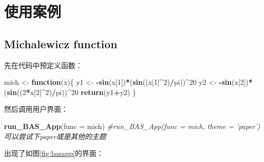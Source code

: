 \documentclass[]{ctexbook}
\newenvironment{Shaded}{\begin{snugshade}}{\end{snugshade}}
\newcommand{\KeywordTok}[1]{\textcolor[rgb]{0.13,0.29,0.53}{\textbf{#1}}}
\newcommand{\DataTypeTok}[1]{\textcolor[rgb]{0.13,0.29,0.53}{#1}}
\newcommand{\DecValTok}[1]{\textcolor[rgb]{0.00,0.00,0.81}{#1}}
\newcommand{\StringTok}[1]{\textcolor[rgb]{0.31,0.60,0.02}{#1}}
\newcommand{\CommentTok}[1]{\textcolor[rgb]{0.56,0.35,0.01}{\textit{#1}}}
\newcommand{\ControlFlowTok}[1]{\textcolor[rgb]{0.13,0.29,0.53}{\textbf{#1}}}
\newcommand{\OperatorTok}[1]{\textcolor[rgb]{0.81,0.36,0.00}{\textbf{#1}}}
\newcommand{\NormalTok}[1]{#1}
\theoremstyle{definition}
\theoremstyle{definition}
\theoremstyle{definition}
\theoremstyle{remark}
\begin{document}
\section{使用案例}

\subsection{Michalewicz function}\label{michalewicz-function-1}

先在代码中预定义函数：

\begin{Shaded}
\begin{Highlighting}[]
\NormalTok{mich <-}\StringTok{ }\ControlFlowTok{function}\NormalTok{(x)\{}
\NormalTok{  y1 <-}\StringTok{ }\OperatorTok{-}\KeywordTok{sin}\NormalTok{(x[}\DecValTok{1}\NormalTok{])}\OperatorTok{*}\NormalTok{(}\KeywordTok{sin}\NormalTok{((x[}\DecValTok{1}\NormalTok{]}\OperatorTok{^}\DecValTok{2}\NormalTok{)}\OperatorTok{/}\NormalTok{pi))}\OperatorTok{^}\DecValTok{20}
\NormalTok{  y2 <-}\StringTok{ }\OperatorTok{-}\KeywordTok{sin}\NormalTok{(x[}\DecValTok{2}\NormalTok{])}\OperatorTok{*}\NormalTok{(}\KeywordTok{sin}\NormalTok{((}\DecValTok{2}\OperatorTok{*}\NormalTok{x[}\DecValTok{2}\NormalTok{]}\OperatorTok{^}\DecValTok{2}\NormalTok{)}\OperatorTok{/}\NormalTok{pi))}\OperatorTok{^}\DecValTok{20}
  \KeywordTok{return}\NormalTok{(y1}\OperatorTok{+}\NormalTok{y2)}
\NormalTok{\}}
\end{Highlighting}
\end{Shaded}

然后调用用户界面：

\begin{Shaded}
\begin{Highlighting}[]
\KeywordTok{run_BAS_App}\NormalTok{(}\DataTypeTok{func =}\NormalTok{ mich)}
\CommentTok{#run_BAS_App(func = mich, theme = 'paper') 可以尝试下paper或是其他的主题}
\end{Highlighting}
\end{Shaded}

出现了如图\ref{fig:basapp}的界面：
\end{document}
